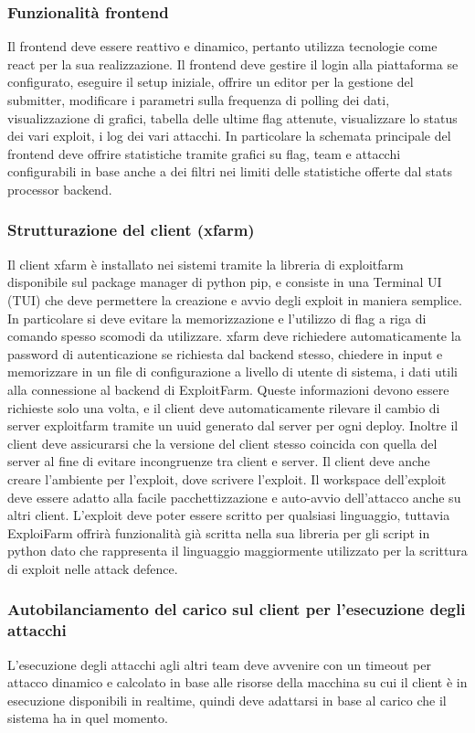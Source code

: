 \documentclass[11pt]{article}
\begin{document}
\subsubsection{Funzionalità frontend}
Il frontend deve essere reattivo e dinamico, pertanto utilizza tecnologie come react per la sua realizzazione. Il frontend deve gestire il login alla piattaforma se configurato, eseguire il setup iniziale, offrire un editor per la gestione del submitter, modificare i parametri sulla frequenza di polling dei dati, visualizzazione di grafici, tabella delle ultime flag attenute, visualizzare lo status dei vari exploit, i log dei vari attacchi.
In particolare la schemata principale del frontend deve offrire statistiche tramite grafici su flag, team e attacchi configurabili in base anche a dei filtri nei limiti delle statistiche offerte dal stats processor backend.
\subsubsection{Strutturazione del client (xfarm)}
Il client xfarm è installato nei sistemi tramite la libreria di exploitfarm disponibile sul package manager di python pip, e consiste in una Terminal UI (TUI) che deve permettere la creazione e avvio degli exploit in maniera semplice. In particolare si deve evitare la memorizzazione e l'utilizzo di flag a riga di comando spesso scomodi da utilizzare. xfarm deve richiedere automaticamente la password di autenticazione se richiesta dal backend stesso, chiedere in input e memorizzare in un file di configurazione a livello di utente di sistema, i dati utili alla connessione al backend di ExploitFarm. Queste informazioni devono essere richieste solo una volta, e il client deve automaticamente rilevare il cambio di server exploitfarm tramite un uuid generato dal server per ogni deploy. Inoltre il client deve assicurarsi che la versione del client stesso coincida con quella del server al fine di evitare incongruenze tra client e server. Il client deve anche creare l'ambiente per l'exploit, dove scrivere l'exploit. Il workspace dell'exploit deve essere adatto alla facile pacchettizzazione e auto-avvio dell'attacco anche su altri client. L'exploit deve poter essere scritto per qualsiasi linguaggio, tuttavia ExploiFarm offrirà funzionalità già scritta nella sua libreria per gli script in python dato che rappresenta il linguaggio maggiormente utilizzato per la scrittura di exploit nelle attack defence.
\subsubsection{Autobilanciamento del carico sul client per l'esecuzione degli attacchi}
L'esecuzione degli attacchi agli altri team deve avvenire con un timeout per attacco dinamico e calcolato in base alle risorse della macchina su cui il client è in esecuzione disponibili in realtime, quindi deve adattarsi in base al carico che il sistema ha in quel momento.
\end{document}
